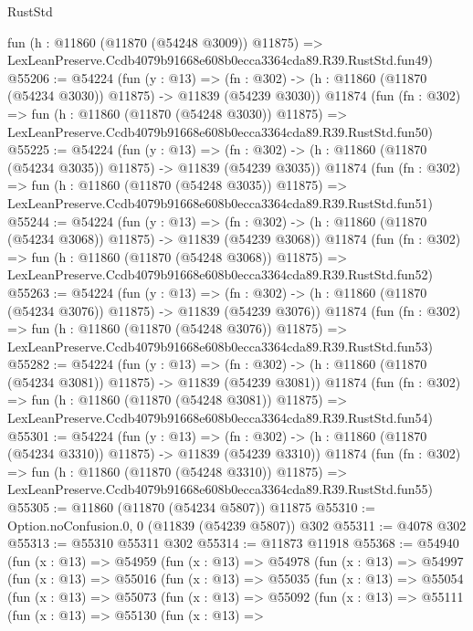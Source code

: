 \begin{lexlean}{RustStd}
\begin{coremodule}
    fun (h : @11860 (@11870 (@54248 @3009)) @11875) =>
    LexLeanPreserve.Ccdb4079b91668e608b0ecca3364cda89.R39.RustStd.fun49)
@55206 := @54224
    (fun (y : @13) =>
    (fn : @302) -> (h : @11860 (@11870 (@54234 @3030)) @11875) -> @11839 (@54239 @3030))
    @11874
    (fun (fn : @302) =>
    fun (h : @11860 (@11870 (@54248 @3030)) @11875) =>
    LexLeanPreserve.Ccdb4079b91668e608b0ecca3364cda89.R39.RustStd.fun50)
@55225 := @54224
    (fun (y : @13) =>
    (fn : @302) -> (h : @11860 (@11870 (@54234 @3035)) @11875) -> @11839 (@54239 @3035))
    @11874
    (fun (fn : @302) =>
    fun (h : @11860 (@11870 (@54248 @3035)) @11875) =>
    LexLeanPreserve.Ccdb4079b91668e608b0ecca3364cda89.R39.RustStd.fun51)
@55244 := @54224
    (fun (y : @13) =>
    (fn : @302) -> (h : @11860 (@11870 (@54234 @3068)) @11875) -> @11839 (@54239 @3068))
    @11874
    (fun (fn : @302) =>
    fun (h : @11860 (@11870 (@54248 @3068)) @11875) =>
    LexLeanPreserve.Ccdb4079b91668e608b0ecca3364cda89.R39.RustStd.fun52)
@55263 := @54224
    (fun (y : @13) =>
    (fn : @302) -> (h : @11860 (@11870 (@54234 @3076)) @11875) -> @11839 (@54239 @3076))
    @11874
    (fun (fn : @302) =>
    fun (h : @11860 (@11870 (@54248 @3076)) @11875) =>
    LexLeanPreserve.Ccdb4079b91668e608b0ecca3364cda89.R39.RustStd.fun53)
@55282 := @54224
    (fun (y : @13) =>
    (fn : @302) -> (h : @11860 (@11870 (@54234 @3081)) @11875) -> @11839 (@54239 @3081))
    @11874
    (fun (fn : @302) =>
    fun (h : @11860 (@11870 (@54248 @3081)) @11875) =>
    LexLeanPreserve.Ccdb4079b91668e608b0ecca3364cda89.R39.RustStd.fun54)
@55301 := @54224
    (fun (y : @13) =>
    (fn : @302) -> (h : @11860 (@11870 (@54234 @3310)) @11875) -> @11839 (@54239 @3310))
    @11874
    (fun (fn : @302) =>
    fun (h : @11860 (@11870 (@54248 @3310)) @11875) =>
    LexLeanPreserve.Ccdb4079b91668e608b0ecca3364cda89.R39.RustStd.fun55)
@55305 := @11860 (@11870 (@54234 @5807)) @11875
@55310 := Option.noConfusion.{0, 0} (@11839 (@54239 @5807)) @302
@55311 := @4078 @302
@55313 := @55310 @55311 @302
@55314 := @11873 @11918
@55368 := @54940
    (fun (x : @13) =>
    @54959
      (fun (x : @13) =>
      @54978
        (fun (x : @13) =>
        @54997
          (fun (x : @13) =>
          @55016
            (fun (x : @13) =>
            @55035
              (fun (x : @13) =>
              @55054
                (fun (x : @13) =>
                @55073
                  (fun (x : @13) =>
                  @55092
                    (fun (x : @13) =>
                    @55111
                      (fun (x : @13) =>
                      @55130
                        (fun (x : @13) =>

\end{coremodule}
\end{lexlean}
